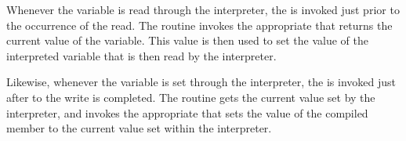 Whenever the variable is read through the interpreter, the
is invoked just prior to the occurrence of the read.
The routine invokes the appropriate
that returns the current value of the variable.
This value is then used to set the value of the interpreted variable
that is then read by the interpreter.

Likewise,
whenever the variable is set through the interpreter, the
is invoked just after to the write is completed.
The routine gets the current value set by the interpreter, 
and invokes the appropriate
that sets the value of the compiled member to the current value set
within the interpreter.

\endinput

### Local Variables:
### mode: latex
### comment-column: 60
### backup-by-copying-when-linked: t
### file-precious-flag: nil
### End:
